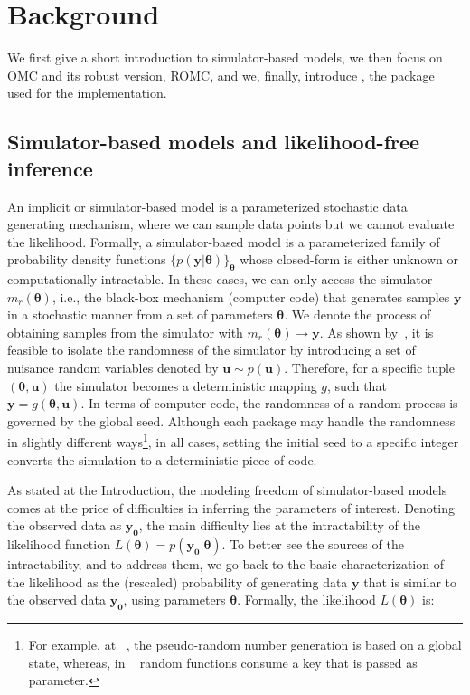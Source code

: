 \documentclass[article]{jss}
\newcommand{\ub}{\mathbf{u}}
\newcommand{\yb}{\mathbf{y}}
\newcommand{\thetab}{\boldsymbol{\theta}}
\newcommand{\simulator}{g}
\newcommand{\data}{\mathbf{y_0}}
\begin{document}
\section{Background}

We first give a short introduction to simulator-based models, we then
focus on OMC and its robust version, ROMC, and we, finally, introduce
, the  package used for the implementation.

\subsection{Simulator-based models and likelihood-free inference}

An implicit or simulator-based model is a parameterized stochastic
data generating mechanism, where we can sample data points but we
cannot evaluate the likelihood. Formally, a simulator-based model is a
parameterized family of probability density functions
\(\{ p(\yb|\thetab)\}_{\thetab}\) whose closed-form is either unknown
or computationally intractable. In these cases, we can only access the
simulator \( m_r(\thetab) \), i.e., the black-box mechanism (computer
code) that generates samples \(\yb\) in a stochastic manner from a set
of parameters \(\thetab\). We denote the process of obtaining samples
from the simulator with \( m_r(\thetab) \rightarrow \yb \). As shown
by~\citet{Meeds2015}, it is feasible to isolate the randomness of the
simulator by introducing a set of nuisance random variables denoted by
\(\ub \sim p(\ub)\). Therefore, for a specific tuple
\((\thetab, \ub)\) the simulator becomes a deterministic mapping
\(g\), such that \(\yb=\simulator(\thetab,\ub)\). In terms of computer
code, the randomness of a random process is governed by the global
seed. Although each package may handle the randomness in slightly
different ways\footnote{For example, at
  ~\citet{harris2020array}, the pseudo-random number
  generation is based on a global state, whereas, in
  ~\citet{jax2018github} random functions consume a key that
  is passed as parameter. }, in all cases, setting the initial seed to
a specific integer converts the simulation to a deterministic piece of
code.

As stated at the Introduction, the modeling freedom of simulator-based
models comes at the price of difficulties in inferring the parameters
of interest. Denoting the observed data as \(\data\), the main
difficulty lies at the intractability of the likelihood function
\(L(\thetab) = p(\data|\thetab)\). To better see the sources of the
intractability, and to address them, we go back to the basic
characterization of the likelihood as the (rescaled) probability of
generating data \(\yb\) that is similar to the observed data
\(\data\), using parameters \(\thetab\). Formally, the likelihood
\(L(\thetab)\) is:
\end{document}
